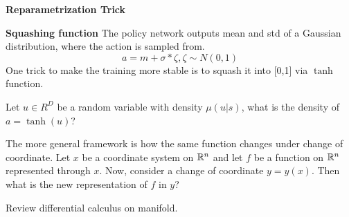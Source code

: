 \documentclass{article}
\begin{document}
\textbf{Reparametrization Trick}

\textbf{Squashing function} The policy network outputs mean and std of a
Gaussian distribution, where the action is sampled from. 
\[
    a = m + \sigma * \zeta, \zeta \sim N(0, 1)
\]
One trick to make the training more stable is to squash it into [0,1] 
via $\tanh$ function. 

Let $u \in R^{D}$ be a random variable with density $\mu(u|s)$, what is 
the density of $a = \tanh(u)$?

The more general framework is how the same function changes under 
change of coordinate. 
Let $x$ be a coordinate system on $\mathbb{R}^n$ and let $f$ be a function on 
$\mathbb{R}^n$ represented through $x$. Now, consider a change of coordinate
$y = y(x)$. Then what is the new representation of $f$ in $y$?

Review differential calculus on manifold.
\end{document}
